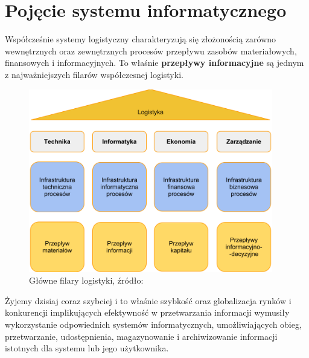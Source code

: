 \section{Pojęcie systemu informatycznego}	
	Współcześnie systemy logistyczny charakteryzują się złożonością zarówno wewnętrznych oraz zewnętrznych
	procesów przepływu zasobów materiałowych, finansowych i informacyjnych. To właśnie \textbf{przepływy informacyjne} 
	są jednym z najważniejszych filarów współczesnej logistyki.
	\begin{figure}[h]
		\centering
		\includegraphics[width=0.95\textwidth]{images/filary_logistyki}
		\caption[Główne filary logistyki]{
			Główne filary logistyki, źródło: \cite{logistyka_w_przedsiebiorstwie}
		}
	\end{figure}
	Żyjemy dzisiaj coraz szybciej i to właśnie szybkość oraz globalizacja rynków i konkurencji
	implikujących efektywność w przetwarzania informacji wymusiły wykorzystanie odpowiednich
	systemów informatycznych, umożliwiających obieg, przetwarzanie, udostępnienia, magazynowanie
	i archiwizowanie informacji istotnych dla systemu lub jego użytkownika.  	
	
